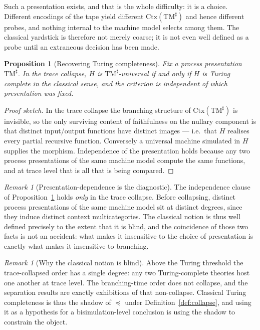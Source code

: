 \documentclass[11pt,a4paper]{article}
\theoremstyle{definition}
\theoremstyle{plain}
\newtheorem{proposition}[definition]{Proposition}
\theoremstyle{remark}
\newtheorem{remark}[definition]{Remark}
\newcommand{\Ctx}{\mathrm{Ctx}}
\begin{document}
Such a presentation exists, and that is the whole difficulty: it is a choice.
Different encodings of the tape yield different $\Ctx(\mathrm{TM}^\sharp)$ and hence
different probes, and nothing internal to the machine model selects among them. The
classical yardstick is therefore not merely coarse; it is not even well defined as a
probe until an extraneous decision has been made.

\begin{proposition}[Recovering Turing completeness]
\label{prop:tc}
Fix a process presentation $\mathrm{TM}^\sharp$. In the trace collapse, $H$ is
$\mathrm{TM}^\sharp$-universal if and only if $H$ is Turing complete in the classical
sense, and the criterion is independent of which presentation was fixed.
\end{proposition}

\begin{proof}[Proof sketch]
In the trace collapse the branching structure of $\Ctx(\mathrm{TM}^\sharp)$ is
invisible, so the only surviving content of faithfulness on the nullary component is
that distinct input/output functions have distinct images --- i.e.\ that $H$ realises
every partial recursive function. Conversely a universal machine simulated in $H$
supplies the morphism. Independence of the presentation holds because any two process
presentations of the same machine model compute the same functions, and at trace level
that is all that is being compared.
\end{proof}

\begin{remark}[Presentation-dependence is the diagnostic]
\label{rem:presdep}
The independence clause of Proposition~\ref{prop:tc} holds \emph{only} in the trace
collapse. Before collapsing, distinct process presentations of the same machine model
sit at distinct degrees, since they induce distinct context multicategories. The
classical notion is thus well defined precisely to the extent that it is blind, and
the coincidence of those two facts is not an accident: what makes it insensitive to
the choice of presentation is exactly what makes it insensitive to branching.
\end{remark}

\begin{remark}[Why the classical notion is blind]
\label{rem:blind}
Above the Turing threshold the trace-collapsed order has a single degree: any two
Turing-complete theories host one another at trace level. The branching-time order
does not collapse, and the separation results \cite{palamidessi,gorla,peters-glabbeek}
are exactly exhibitions of that non-collapse. Classical Turing completeness is thus
the shadow of $\preceq$ under Definition~\ref{def:collapse}, and using it as a
hypothesis for a bisimulation-level conclusion is using the shadow to constrain the
object.
\end{remark}
\end{document}

